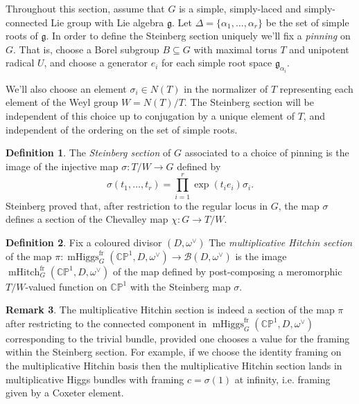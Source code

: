 \documentclass[11pt, oneside, reqno]{amsart}
\theoremstyle{definition} \newtheorem{definition}{Definition}[section]
\theoremstyle{definition} \newtheorem{remark}[definition]{Remark}
\theoremstyle{definition} \newtheorem{remarks}[definition]{Remarks}
\theoremstyle{definition} \newtheorem{question}[definition]{Question}
\theoremstyle{definition} \newtheorem*{note}{Note}
\theoremstyle{definition} \newtheorem{example}[definition]{Example}
\theoremstyle{definition} \newtheorem{examples}[definition]{Examples}
\renewcommand{\gg}{\mathfrak{g}}
\newcommand{\bb}[1]{\mathbb{#1}}
\newcommand{\mc}[1]{\mathcal{#1}}
\newcommand{\sub}{\subseteq}
\DeclareMathOperator{\mhiggs}{mHiggs}
\DeclareMathOperator{\mhitch}{mHitch}
\newcommand{\fr}{\mathrm{fr}}
\begin{document}
Throughout this section, assume that $G$ is a simple, simply-laced and simply-connected Lie group with Lie algebra $\gg$.  Let $\Delta = \{\alpha_1, \ldots, \alpha_r\}$ be the set of simple roots of $\gg$.  In order to define the Steinberg section uniquely we'll fix a \emph{pinning} on $G$.  That is, choose a Borel subgroup $B \sub G$ with maximal torus $T$ and unipotent radical $U$, and choose a generator $e_i$ for each simple root space $\gg_{\alpha_i}$.

We'll also choose an element $\sigma_i \in N(T)$ in the normalizer of $T$ representing each element of the Weyl group $W = N(T)/T$.  The Steinberg section will be independent of this choice up to conjugation by a unique element of $T$, and independent of the ordering on the set of simple roots.

\begin{definition} \label{Steinberg_section_def}
The \emph{Steinberg section} of $G$ associated to a choice of pinning is the image of the injective map $\sigma \colon T/W \to G$ defined by
\[\sigma(t_1, \ldots, t_r) = \prod_{i=1}^r \exp(t_i e_i) \sigma_i.\]
Steinberg proved \cite[Theorem 1.4]{Steinberg} that, after restriction to the regular locus in $G$, the map $\sigma$ defines a section of the Chevalley map $\chi \colon G \to T/W$.
\end{definition}

\begin{definition} \label{mhitch_section_def}
Fix a coloured divisor $(D,\omega^\vee)$ The \emph{multiplicative Hitchin section} of the map $\pi \colon \mhiggs^\fr_G(\bb{CP}^1,D,\omega^\vee) \to \mc B(D,\omega^\vee)$ is the image $\mhitch^\fr_G(\bb{CP}^1, D, \omega^\vee)$ of the map defined by post-composing a meromorphic $T/W$-valued function on $\bb{CP}^1$ with the Steinberg map $\sigma$.
\end{definition}

\begin{remark}
The multiplicative Hitchin section is indeed a section of the map $\pi$ after restricting to the connected component in $\mhiggs^\fr_G(\bb{CP}^1,D,\omega^\vee)$ corresponding to the trivial bundle, provided one chooses a value for the framing within the Steinberg section.  For example, if we choose the identity framing on the multiplicative Hitchin basis then the multiplicative Hitchin section lands in multiplicative Higgs bundles with framing $c = \sigma(1)$ at infinity, i.e. framing given by a Coxeter element.
\end{remark}
\end{document}
